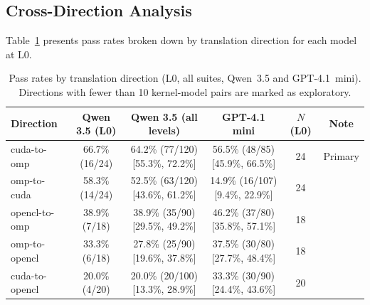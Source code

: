 \documentclass{article}
\begin{document}
\subsection{Cross-Direction Analysis}
\label{sec:direction-analysis}

Table~\ref{tab:direction-rates} presents pass rates broken down by translation direction for each model at L0.

\begin{table}[t]
\centering
\caption{Pass rates by translation direction (L0, all suites, Qwen~3.5 and GPT-4.1~mini). Directions with fewer than 10 kernel-model pairs are marked as exploratory.}
\label{tab:direction-rates}
\small
\begin{tabular}{@{}lccccc@{}}
\toprule
Direction & Qwen 3.5 (L0) & Qwen 3.5 (all levels) & GPT-4.1 mini & $N$ (L0) & Note \\
\midrule
cuda-to-omp & 66.7\% (16/24) & 64.2\% (77/120) [55.3\%, 72.2\%] & 56.5\% (48/85) [45.9\%, 66.5\%] & 24 & Primary \\ %
omp-to-cuda & 58.3\% (14/24) & 52.5\% (63/120) [43.6\%, 61.2\%] & 14.9\% (16/107) [9.4\%, 22.9\%] & 24 & \\ %
opencl-to-omp & 38.9\% (7/18) & 38.9\% (35/90) [29.5\%, 49.2\%] & 46.2\% (37/80) [35.8\%, 57.1\%] & 18 & \\ %
omp-to-opencl & 33.3\% (6/18) & 27.8\% (25/90) [19.6\%, 37.8\%] & 37.5\% (30/80) [27.7\%, 48.4\%] & 18 & \\ %
cuda-to-opencl & 20.0\% (4/20) & 20.0\% (20/100) [13.3\%, 28.9\%] & 33.3\% (30/90) [24.4\%, 43.6\%] & 20 & \\ %

\end{tabular}
\end{table}
\end{document}
